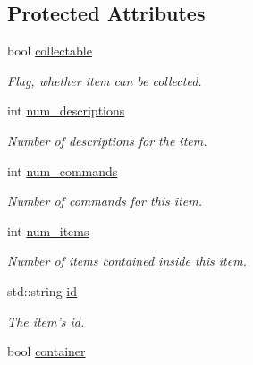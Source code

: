 \subsection*{\-Protected \-Attributes}
\begin{DoxyCompactItemize}
\item 
\hypertarget{class_item_a6bdb6d40e682e1cac093a786cb51d1d1}{
bool \hyperlink{class_item_a6bdb6d40e682e1cac093a786cb51d1d1}{collectable}}
\label{class_item_a6bdb6d40e682e1cac093a786cb51d1d1}

\begin{DoxyCompactList}\small\item\em \-Flag, whether item can be collected. \end{DoxyCompactList}\item 
\hypertarget{class_item_a0bedf3dd3801688ca197958b4ed82cd7}{
int \hyperlink{class_item_a0bedf3dd3801688ca197958b4ed82cd7}{num\-\_\-descriptions}}
\label{class_item_a0bedf3dd3801688ca197958b4ed82cd7}

\begin{DoxyCompactList}\small\item\em \-Number of descriptions for the item. \end{DoxyCompactList}\item 
\hypertarget{class_item_ac9e4624443be051800792a7f37014373}{
int \hyperlink{class_item_ac9e4624443be051800792a7f37014373}{num\-\_\-commands}}
\label{class_item_ac9e4624443be051800792a7f37014373}

\begin{DoxyCompactList}\small\item\em \-Number of commands for this item. \end{DoxyCompactList}\item 
\hypertarget{class_item_ab09c4bcd4d8d1d4626c38e230610df42}{
int \hyperlink{class_item_ab09c4bcd4d8d1d4626c38e230610df42}{num\-\_\-items}}
\label{class_item_ab09c4bcd4d8d1d4626c38e230610df42}

\begin{DoxyCompactList}\small\item\em \-Number of items contained inside this item. \end{DoxyCompactList}\item 
\hypertarget{class_item_a1c8acc0ec062f69ccc65faf2a3a44bdb}{
std\-::string \hyperlink{class_item_a1c8acc0ec062f69ccc65faf2a3a44bdb}{id}}
\label{class_item_a1c8acc0ec062f69ccc65faf2a3a44bdb}

\begin{DoxyCompactList}\small\item\em \-The item's id. \end{DoxyCompactList}\item 
\hypertarget{class_item_a7f22375d075c99d1ecfc3f535f74d43f}{
bool \hyperlink{class_item_a7f22375d075c99d1ecfc3f535f74d43f}{container}}
\label{class_item_a7f22375d075c99d1ecfc3f535f74d43f}


\end{DoxyCompactItemize}
